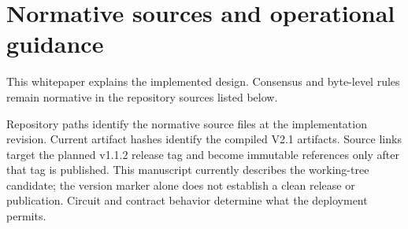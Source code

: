 \documentclass[11pt,letterpaper]{article}
\begin{document}
\section{Normative sources and operational
guidance}\label{normative-sources-and-operational-guidance}

This whitepaper explains the implemented design. Consensus and
byte-level rules remain normative in the repository sources listed
below.

Repository paths identify the normative source files at the
implementation revision. Current artifact hashes identify the compiled
V2.1 artifacts. Source links target the planned v1.1.2 release tag and
become immutable references only after that tag is published. This
manuscript currently describes the working-tree candidate; the version
marker alone does not establish a clean release or publication. Circuit
and contract behavior determine what the deployment permits.
\end{document}
